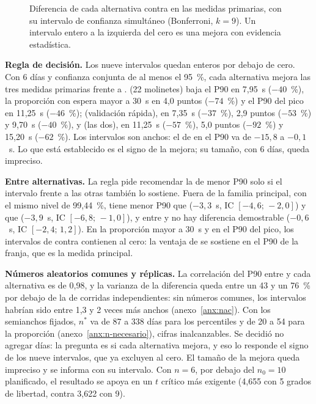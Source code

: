 \begin{figure}[H]
\centering
{}
\caption{Diferencia de cada alternativa contra \EO{} en las medidas primarias, con su intervalo de confianza
simultáneo (Bonferroni, $k = 9$). Un intervalo entero a la izquierda del cero es una mejora con evidencia
estadística.}
\label{fig:forest}
\end{figure}

\textbf{Regla de decisión.} Los nueve intervalos quedan enteros por debajo de cero. Con 6 días y confianza
conjunta de al menos el 95~\%, cada alternativa mejora las tres medidas primarias frente a \EO{}. \EI{}
(22 molinetes) baja el P90 en 7,95~s ($-40$~\%), la proporción con espera mayor a 30~s en 4,0 puntos
($-74$~\%) y el P90 del pico en 11,25~s ($-46$~\%); \ET{} (validación rápida), en 7,35~s ($-37$~\%), 2,9 puntos
($-53$~\%) y 9,70~s ($-40$~\%), y \EIT{} (las dos), en 11,25~s ($-57$~\%), 5,0 puntos ($-92$~\%) y 15,20~s
($-62$~\%). Los intervalos son anchos: el de \EI{} en el P90 va de $-15{,}8$ a $-0{,}1$~s. Lo que está
establecido es el signo de la mejora; su tamaño, con 6 días, queda impreciso.

\textbf{Entre alternativas.} La regla pide recomendar la de menor P90 solo si el intervalo frente a las otras
también lo sostiene. Fuera de la familia principal, con el mismo nivel de 99,44~\%, \EIT{} tiene menor P90 que
\EI{} ($-3{,}3$~s, IC $[-4{,}6;\,-2{,}0]$) y que \ET{} ($-3{,}9$~s, IC $[-6{,}8;\,-1{,}0]$), y entre \EI{} y
\ET{} no hay diferencia demostrable ($-0{,}6$~s, IC $[-2{,}4;\,1{,}2]$). En la proporción mayor a 30~s y en el
P90 del pico, los intervalos de \EIT{} contra \ET{} contienen al cero: la ventaja de \EIT{} se sostiene en el
P90 de la franja, que es la medida principal.

\textbf{Números aleatorios comunes y réplicas.} La correlación del P90 entre \EO{} y cada alternativa es de
0,98, y la varianza de la diferencia queda entre un 43 y un 76~\% por debajo de la de corridas independientes:
sin números comunes, los intervalos habrían sido entre 1,3 y 2 veces más anchos (anexo~\ref{anx:nac}). Con los
semianchos fijados, $n^{*}$ va de 87 a 338 días para los percentiles y de 20 a 54 para la proporción
(anexo~\ref{anx:n-necesario}), cifras inalcanzables. Se decidió no agregar días: la pregunta es si cada
alternativa mejora, y eso lo responde el signo de los nueve intervalos, que ya excluyen al cero. El tamaño de la
mejora queda impreciso y se informa con su intervalo. Con $n = 6$, por debajo del $n_0 = 10$ planificado, el
resultado se apoya en un $t$ crítico más exigente (4,655 con 5 grados de libertad, contra 3,622 con 9).
